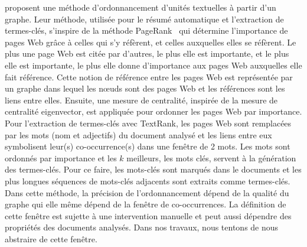      proposent une méthode d'ordonnancement
    d'unités textuelles à partir d'un graphe. Leur méthode, utilisée pour le
    résumé automatique et l'extraction de termes-clés, s'inspire de la méthode
    PageRank~\cite[Google]{brin1998pagerank} qui détermine l'importance de pages
    Web grâce à celles qui s'y réfèrent, et celles auxquelles elles se réfèrent.
    Le plus une page Web est citée par d'autres, le plus elle est importante, et
    le plus elle est importante, le plus elle donne d'importance aux pages Web
    auxquelles elle fait référence. Cette notion de référence entre les pages
    Web est représentée par un graphe dans lequel les n\oe{}uds sont des pages
    Web et les références sont les liens entre elles. Ensuite, une mesure de
    centralité, inspirée de la mesure de centralité eigenvector, est appliquée
    pour ordonner les pages Web par importance. Pour l'extraction de termes-clés
    avec TextRank, les pages Web sont remplacées par les mots (nom et adjectifs)
    du document analysé et les liens entre eux symbolisent leur(s)
    co-occurrence(s) dans une fenêtre de 2 mots. Les mots sont ordonnés par
    importance et les $k$ meilleurs, les mots clés, servent à la génération des
    termes-clés. Pour ce faire, les mots-clés sont marqués dans le documents et
    les plus longues séquences de mots-clés adjacents sont extraits comme
    termes-clés. Dans cette méthode, la précision de l'ordonnancement dépend de
    la qualité du graphe qui elle même dépend de la fenêtre de co-occurrences.
    La définition de cette fenêtre est sujette à une intervention manuelle et
    peut aussi dépendre des propriétés des documents analysés. Dans nos travaux,
    nous tentons de nous abstraire de cette fenêtre.

